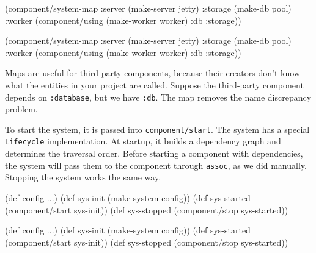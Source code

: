 \ifnarrow

\begin{english}
  \begin{clojure}
(component/system-map
 :server  (make-server jetty)
 :storage (make-db pool)
 :worker  (component/using
            (make-worker worker)
            {:db :storage}))
  \end{clojure}
\end{english}

\else

\begin{english}
  \begin{clojure}
(component/system-map
 :server  (make-server jetty)
 :storage (make-db pool)
 :worker  (component/using
           (make-worker worker) {:db :storage}))
  \end{clojure}
\end{english}

\fi

Maps are useful for third party components, because their creators don't know what the entities in your project are called. Suppose the third-party component depends on \verb|:database|, but we have \verb|:db|. The map removes the name discrepancy problem.

To start the system, it is passed into \verb|component/start|. The system has a special \verb|Lifecycle| implementation. At startup, it builds a dependency graph and determines the traversal order. Before starting a component with dependencies, the system will pass them to the component through \verb|assoc|, as we did manually. Stopping the system works the same way.

\ifnarrow

\begin{english}
  \begin{clojure}
(def config {...})
(def sys-init (make-system config))
(def sys-started
  (component/start sys-init))
(def sys-stopped
  (component/stop sys-started))
  \end{clojure}
\end{english}

\else

\begin{english}
  \begin{clojure}
(def config {...})
(def sys-init (make-system config))
(def sys-started (component/start sys-init))
(def sys-stopped (component/stop sys-started))
  \end{clojure}
\end{english}

